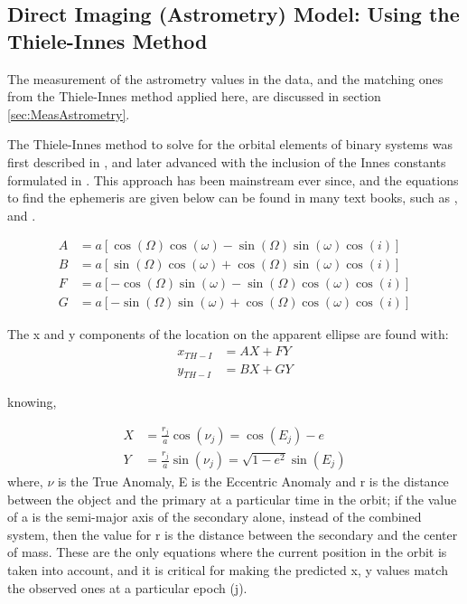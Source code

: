 \documentclass[12pt,preprint]{aastex}
\begin{document}
\subsection{Direct Imaging (Astrometry) Model: Using the Thiele-Innes Method}\label{sec:TH_I} 

The measurement of the astrometry values in the data, and the matching ones from the Thiele-Innes method applied here, are discussed in section \ref{sec:MeasAstrometry}.

The Thiele-Innes method to solve for the orbital elements of binary systems was first described in \citet{Thiele}, and later advanced with the inclusion of the Innes constants formulated in \citet{Van}.  This approach has been mainstream ever since, and the equations to find the ephemeris are given below can be found in many text books, such as \citet{aitken}, \citet{binnendijk} and \citet{heintz}.

\begin{subequations}
\begin{align}\label{eq:24a}
A& = a[\cos(\Omega)\cos(\omega)-\sin(\Omega)\sin(\omega)\cos(i)]\\
\label{eq:24b}
B& = a[\sin(\Omega)\cos(\omega)+\cos(\Omega)\sin(\omega)\cos(i)]\\
\label{eq:24c}
F& = a[-\cos(\Omega)\sin(\omega)-\sin(\Omega)\cos(\omega)\cos(i)]\\
\label{eq:24d}
G& = a[-\sin(\Omega)\sin(\omega)+\cos(\Omega)\cos(\omega)\cos(i)]
\end{align}
\end{subequations}

The x and y components of the location on the apparent ellipse are found with:
\begin{subequations}
\begin{align}\label{eq:28-1a}
x_{TH-I}& = AX+FY\\
\label{eq:28-1b}
y_{TH-I}& = BX + GY
\end{align}
\end{subequations}

knowing,

\begin{subequations}
\begin{align}\label{eq:28-1.5a}
X& = \frac{r_j}{a}\cos(\nu_j) =\cos(E_j)-e\\
\label{eq:28-1.5b}
Y& = \frac{r_j}{a}\sin(\nu_j) = \sqrt{1-e^2}\sin(E_j) 
\end{align}
\end{subequations}
where, $\nu$ is the True Anomaly, E is the Eccentric Anomaly and r is the distance between the object and the primary at a particular time in the orbit; if the value of a is the semi-major axis of the secondary alone, instead of the combined system, then the value for r is the distance between the secondary and the center of mass.  These are the only equations where the current position in the orbit is taken into account, and it is critical for making the predicted x, y values match the observed ones at a particular epoch (j).
\end{document}
